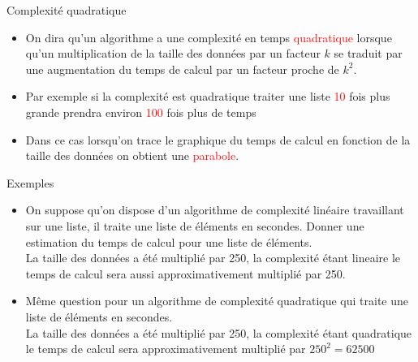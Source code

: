 \documentclass[10pt]{beamer}
\begin{document}
\begin{frame}
	\mframe{\Algotris}
	\begin{block}{Complexité quadratique}
		\begin{itemize}
			\item<2-> On dira qu'un algorithme a une complexité en temps \textcolor{red}{quadratique} lorsque qu'un multiplication de la taille des données par un facteur $k$ se traduit par une augmentation du temps de calcul par un facteur proche de $k^2$.
			\item<3-> Par exemple si la complexité est quadratique traiter une liste \textcolor{red}{10} fois plus grande prendra environ \textcolor{red}{100} fois plus de temps
			\item<4-> Dans ce cas lorsqu'on trace le graphique du temps de calcul en fonction de la taille des données on obtient une \textcolor{red}{parabole}.
		\end{itemize}
	\end{block}
\end{frame}


\begin{frame}
	\mframe{\Algotris}
	\begin{exampleblock}{Exemples}
		\begin{itemize}
			\item<1-> On suppose qu'on dispose d'un algorithme de complexité linéaire travaillant sur une liste, il traite une liste de  éléments en  secondes. Donner une estimation du temps de calcul pour une liste de  éléments.\\
			      \onslide<2-> {\textcolor{OliveGreen}{La taille des données a été multiplié par 250, la complexité étant lineaire le temps de calcul sera aussi approximativement multiplié par 250. \\}}
			      \onslide<3->{\textcolor{OliveGreen}{$0.015 \times 250 = 3.75$, on peut donc prévoir un temps de calcul d'environ 3,75 secondes}}
			\item<4-> Même question pour un algorithme de complexité quadratique qui traite une liste de  éléments en  secondes.\\
			      \onslide<5-> {\textcolor{OliveGreen}{La taille des données a été multiplié par 250, la complexité étant quadratique le temps de calcul sera  approximativement multiplié par $250^2=62500$ \\}}
			      \onslide<6->{\textcolor{OliveGreen}{$0.07 \times 62\,500 = 4375$, on peut donc prévoir un temps de calcul d'environ $4\,375$ secondes, c'est à dire près d'une heure et 15 minutes !}}
		\end{itemize}
	\end{exampleblock}
\end{frame}
\end{document}
